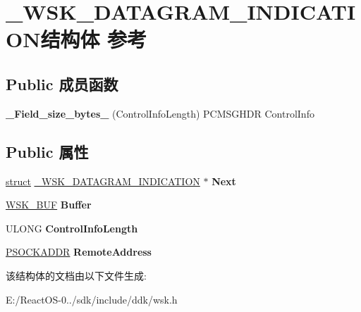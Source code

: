 \hypertarget{struct___w_s_k___d_a_t_a_g_r_a_m___i_n_d_i_c_a_t_i_o_n}{}\section{\+\_\+\+W\+S\+K\+\_\+\+D\+A\+T\+A\+G\+R\+A\+M\+\_\+\+I\+N\+D\+I\+C\+A\+T\+I\+O\+N结构体 参考}
\label{struct___w_s_k___d_a_t_a_g_r_a_m___i_n_d_i_c_a_t_i_o_n}
\subsection*{Public 成员函数}
\begin{DoxyCompactItemize}
\item 
\mbox{\label{struct___w_s_k___d_a_t_a_g_r_a_m___i_n_d_i_c_a_t_i_o_n_a273b8fdcf7f21e010819db8556323c6e}} 
{\bfseries \+\_\+\+Field\+\_\+size\+\_\+bytes\+\_\+} (Control\+Info\+Length) P\+C\+M\+S\+G\+H\+DR Control\+Info
\end{DoxyCompactItemize}
\subsection*{Public 属性}
\begin{DoxyCompactItemize}
\item 
\mbox{\label{struct___w_s_k___d_a_t_a_g_r_a_m___i_n_d_i_c_a_t_i_o_n_af081fff00e4f6db574224a46ddcc9dd2}} 
\hyperlink{interfacestruct}{struct} \hyperlink{struct___w_s_k___d_a_t_a_g_r_a_m___i_n_d_i_c_a_t_i_o_n}{\+\_\+\+W\+S\+K\+\_\+\+D\+A\+T\+A\+G\+R\+A\+M\+\_\+\+I\+N\+D\+I\+C\+A\+T\+I\+ON} $\ast$ {\bfseries Next}
\item 
\mbox{\label{struct___w_s_k___d_a_t_a_g_r_a_m___i_n_d_i_c_a_t_i_o_n_a0de14ea0648d1eb57c77d029586bbd83}} 
\hyperlink{struct___w_s_k___b_u_f}{W\+S\+K\+\_\+\+B\+UF} {\bfseries Buffer}
\item 
\mbox{\label{struct___w_s_k___d_a_t_a_g_r_a_m___i_n_d_i_c_a_t_i_o_n_a8ab1054e6e1d34730c487f1a31ba912c}} 
U\+L\+O\+NG {\bfseries Control\+Info\+Length}
\item 
\mbox{\label{struct___w_s_k___d_a_t_a_g_r_a_m___i_n_d_i_c_a_t_i_o_n_a7dabc2ba82fa6cb4650268fd08b26060}} 
\hyperlink{structsockaddr}{P\+S\+O\+C\+K\+A\+D\+DR} {\bfseries Remote\+Address}
\end{DoxyCompactItemize}


该结构体的文档由以下文件生成\+:\begin{DoxyCompactItemize}
\item 
E\+:/\+React\+O\+S-\/0../sdk/include/ddk/wsk.\+h\end{DoxyCompactItemize}
